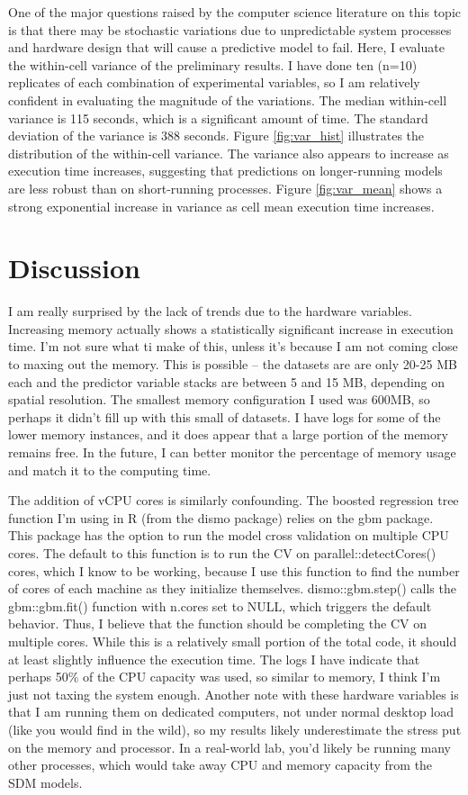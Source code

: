 \documentclass[a4paper]{article}
\begin{document}
One of the major questions raised by the computer science literature on this topic is that there may be stochastic variations due to unpredictable system processes and hardware design that will cause a predictive model to fail.  Here, I evaluate the within-cell variance of the preliminary results.  I have done ten (n=10) replicates of each combination of experimental variables, so I am relatively confident in evaluating the magnitude of the variations.  The median within-cell variance is 115 seconds, which is a significant amount of time. The standard deviation of the variance is 388 seconds.  Figure \ref{fig:var_hist} illustrates the distribution of the within-cell variance.  The variance also appears to increase as execution time increases, suggesting that predictions on longer-running models are less robust than on short-running processes. Figure \ref{fig:var_mean} shows a strong exponential increase in variance as cell mean execution time increases. 

\section{Discussion}
I am really surprised by the lack of trends due to the hardware variables.  Increasing memory actually shows a statistically significant increase in execution time.  I'm not sure what ti make of this, unless it's because I am not coming close to maxing out the memory.  This is possible -- the datasets are are only 20-25 MB each and the predictor variable stacks are between 5 and 15 MB, depending on spatial resolution.  The smallest memory configuration I used was 600MB, so perhaps it didn't fill up with this small of datasets. I have logs for some of the lower memory instances, and it does appear that a large portion of the memory remains free. In the future, I can better monitor the percentage of memory usage and match it to the computing time.

The addition of vCPU cores is similarly confounding.  The boosted regression tree function I'm using in R (from the dismo package) relies on the gbm package.  This package has the option to run the model cross validation on multiple CPU cores.  The default to this function is to run the CV on parallel::detectCores() cores, which I know to be working, because I use this function to find the number of cores of each machine as they initialize themselves.  dismo::gbm.step() calls the gbm::gbm.fit() function with n.cores set to NULL, which triggers the default behavior.  Thus, I believe that the function should be completing the CV on multiple cores.  While this is a relatively small portion of the total code, it should at least slightly influence the execution time.  The logs I have indicate that perhaps 50\% of the CPU capacity was used, so similar to memory, I think I'm just not taxing the system enough.  Another note with these hardware variables is that I am running them on dedicated computers, not under normal desktop load (like you would find in the wild), so my results likely underestimate the stress put on the memory and processor.  In a real-world lab, you'd likely be running many other processes, which would take away CPU and memory capacity from the SDM models.
\end{document}
